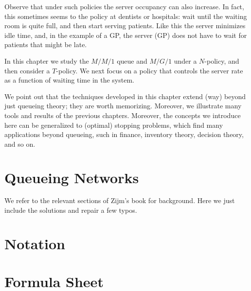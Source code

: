 Observe that under such policies the server occupancy can also increase.
In fact, this sometimes seems to the policy at dentists or hospitals: wait until the waiting room is quite full, and then start serving patients.
Like this the server minimizes idle time, and, in the example of a GP, the server (GP) does not have to wait for patients that might be late.

In this chapter we study the $M/M/1$ queue and $M/G/1$ under a $N$-policy, and then consider a $T$-policy.
We next focus on a policy that controls the server rate as a function of waiting time in the system.


We point out that the techniques developed in this chapter extend (way) beyond just queueing theory; they are worth memorizing.
Moreover, we illustrate many tools and results of the previous chapters.
Moreover, the concepts we introduce here can be generalized to (optimal) stopping problems, which find many applications beyond queueing, such in finance, inventory theory, decision theory, and so on.





%    

\chapter{Queueing Networks}
\label{sec:notes-relat-chapt2}

We refer to the relevant sections of Zijm's book for background. Here we just include the solutions and repair a few typos. 


%

%
%
%
%
%

\ifshowextra
   
\fi



\backmatter





\chapter{Notation}
\label{sec:notation}


\chapter{Formula Sheet}


\printindex




